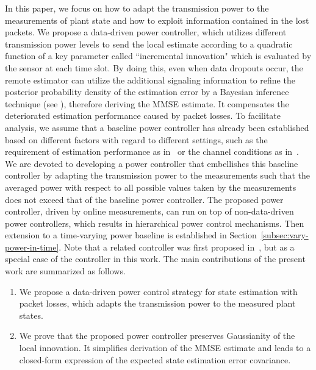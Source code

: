 \documentclass[twocolumn]{autart}    \usepackage{cite}
\begin{document}
{In this paper, we focus on how to adapt the transmission power to the
measurements of plant state and how to exploit information contained in the lost packets. We propose a data-driven power controller, which utilizes
different transmission power levels to send the local estimate according to a quadratic function of a key parameter called ``incremental
innovation" which is evaluated by the sensor at each time slot.
By doing this, even when data dropouts occur, {the
remote estimator can utilize the additional signaling information
to refine the posterior probability density} of the estimation error by a Bayesian inference technique (see
\cite{box2011bayesian}), therefore deriving the
MMSE estimate. It compensates the
deteriorated estimation performance caused by packet losses.
{To facilitate analysis, we assume that a baseline power controller has already been
established based on different factors with regard to different settings, such as
the requirement of estimation performance as in~\cite{shi2012optimal}
or the channel conditions as in~\cite{queahl10,quevedo2012kalman,leong2012power}.
We are devoted to developing a power controller that
embellishes this baseline controller by adapting the transmission power
to the measurements such that the averaged power
with respect to all
possible values taken by the measurements does not exceed that of the baseline power controller.
The proposed power controller, driven by online measurements,
can run on top of non-data-driven power controllers, which results in
hierarchical power control mechanisms.
Then extension to a time-varying power baseline is established in
Section~\ref{subsec:vary-power-in-time}.} Note that a related controller
was first proposed in~\cite{Liyuzhe13CDC}, but as a special case of the
controller in this work. The main contributions of the present work
are summarized as follows.
\vspace{-3mm}
\begin{enumerate}
\item We propose a data-driven power control
strategy for state estimation with packet losses, which adapts the transmission power to the
measured plant states.

\item We prove that the proposed power controller preserves Gaussianity of the local innovation. It simplifies derivation of the MMSE estimate and leads to a closed-form expression of the expected state estimation error covariance.


\end{enumerate}}
\end{document}
